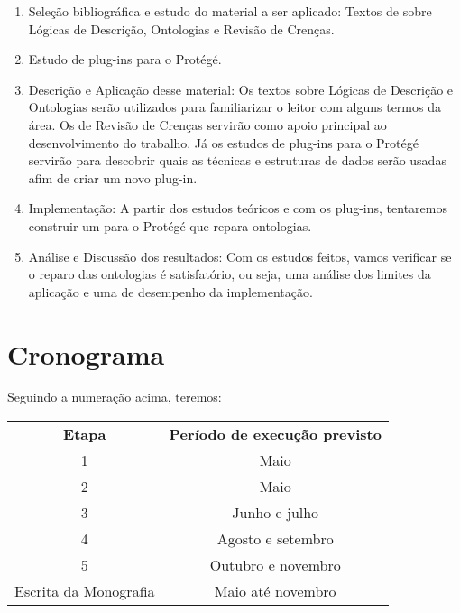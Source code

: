 \documentclass[12pt,letterpaper]{article}
\begin{document}
	\begin{enumerate}
		\item Seleção bibliográfica e estudo do material a ser aplicado: Textos de sobre Lógicas de Descrição, Ontologias e Revisão de Crenças. 
		\item Estudo de plug-ins para o Protégé.
		\item Descrição e Aplicação desse material: Os textos sobre Lógicas de Descrição e Ontologias serão utilizados para familiarizar o leitor com alguns termos da área. Os de Revisão de Crenças servirão como apoio principal ao desenvolvimento do trabalho. Já os estudos de plug-ins para o Protégé servirão para descobrir quais as técnicas e estruturas de dados serão usadas afim de criar um novo plug-in. 
		\item Implementação: A partir dos estudos teóricos e com os plug-ins, tentaremos construir um para o Protégé que repara ontologias.
		\item Análise e Discussão dos resultados: Com os estudos feitos, vamos verificar se o reparo das ontologias é satisfatório, ou seja, uma análise dos limites da aplicação e uma de desempenho da implementação.
	\end{enumerate}
	
	\section{Cronograma}

	Seguindo a numeração acima, teremos:
	
	\begin{center}
		\begin{tabular}{|c|c|}
			\cline{1-2}
			\textbf{Etapa} & \textbf{Período de execução previsto}  \\ \cline{1-2}
			1 & Maio \\ \cline{1-2}
			2 & Maio \\ \cline{1-2}
			3 & Junho e julho \\ \cline{1-2}
			4 & Agosto e setembro \\ \cline{1-2}
			5 & Outubro e novembro \\ \cline{1-2}
			Escrita da Monografia & Maio até novembro  \\ \cline{1-2}
		\end{tabular}
	\end{center}
	
	
	
	 
\end{document}
